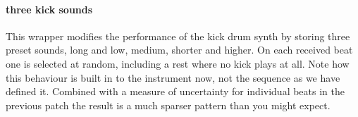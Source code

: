\paragraph{three kick sounds}
This wrapper modifies the performance of the kick drum synth
by storing three preset sounds, long and low, medium, shorter and higher.
On each received beat one is selected at random, including a rest where
no kick plays at all. Note how this behaviour is built in to the
instrument now, not the sequence as we have defined it. 
Combined with a measure of uncertainty for individual beats in the previous 
patch the result is a much sparser pattern than you might expect.

